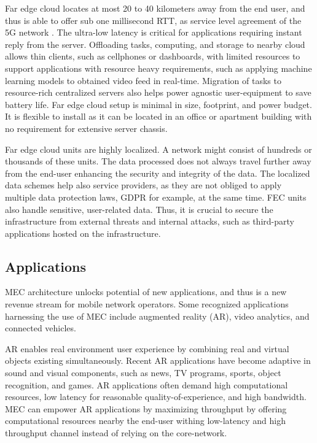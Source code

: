 Far edge cloud locates at most 20 to 40 kilometers away from the end user, and thus is able to offer sub one millisecond RTT, as service level agreement of the 5G network \cite{Parvez2018}. The ultra-low latency is critical for applications requiring instant reply from the server. Offloading tasks, computing, and storage to nearby cloud allows thin clients, such as cellphones or dashboards, with limited resources to support applications with resource heavy requirements, such as applying machine learning models to obtained video feed in real-time. Migration of tasks to resource-rich centralized servers also helps power agnostic user-equipment to save battery life. Far edge cloud setup is minimal in size, footprint, and power budget. It is flexible to install as it can be located in an office or apartment building with no requirement for extensive server chassis. \cite{AirFrameOpenEdgeServer}

Far edge cloud units are highly localized. A network might consist of hundreds or thousands of these units. The data processed does not always travel further away from the end-user enhancing the security and integrity of the data. The localized data schemes help also service providers, as they are not obliged to apply multiple data protection laws, GDPR for example, at the same time. FEC units also handle sensitive, user-related data. Thus, it is crucial to secure the infrastructure from external threats and internal attacks, such as third-party applications hosted on the infrastructure.

\subsection{Applications}
\label{subs:applications}

MEC architecture unlocks potential of new applications, and thus is a new revenue stream for mobile network operators. Some recognized applications harnessing the use of MEC include augmented reality (AR), video analytics, and connected vehicles.

AR enables real environment user experience by combining real and virtual objects existing simultaneously. Recent AR applications have become adaptive in sound and visual components, such as news, TV programs, sports, object recognition, and games. AR applications often demand high computational resources, low latency for reasonable quality-of-experience, and high bandwidth. MEC can empower AR applications by maximizing throughput by offering computational resources nearby the end-user withing low-latency and high throughput channel instead of relying on the core-network. \cite{Abbas2018}

